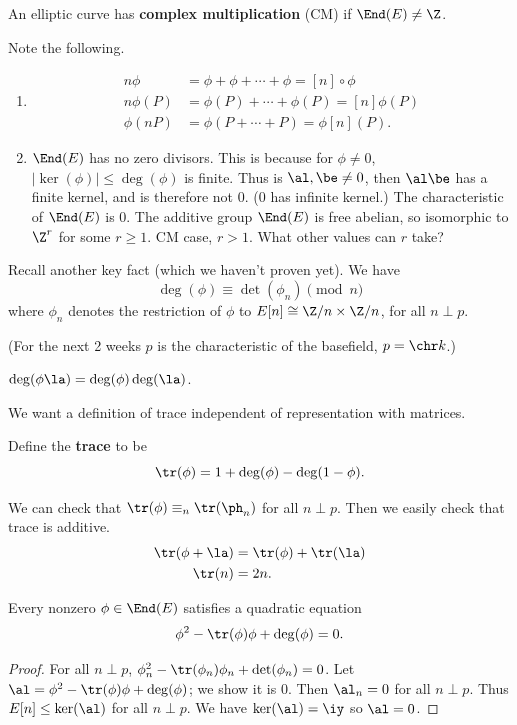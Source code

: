\begin{df}
An elliptic curve has \textbf{complex multiplication} (CM) if $\End(E)\ne \Z$. 
\end{df}
Note the following.
\begin{enumerate}
\item
\begin{align*}
n\phi&=\phi+\phi+\cdots +\phi = [n]\circ \phi\\
n\phi(P)&=\phi(P)+\cdots +\phi(P) = [n]\phi(P)\\
\phi(nP)&=\phi(P+\cdots +P)=\phi[n](P).
\end{align*}
\item
$\End(E)$ has no zero divisors. This is because for $\phi\ne 0$, $|\ker(\phi)|\le \deg(\phi)$ is finite. Thus is $\al,\be\ne 0$, then $\al\be$ has a finite kernel, and is therefore not 0. (0 has infinite kernel.) The characteristic of $\End(E)$ is 0. The additive group $\End(E)$ is free abelian, so isomorphic to $\Z^r$ for some $r\ge 1$. CM case, $r>1$. What other values can $r$ take?
\end{enumerate}
Recall another key fact (which we haven't proven yet). We have
\[
\deg(\phi)\equiv\det(\phi_n)\pmod{n}
\]
where $\phi_n$ denotes the restriction of $\phi$ to $E[n]\cong \Z/n\times \Z/n$, for all $n\perp p$.

(For the next 2 weeks $p$ is the characteristic of the basefield, $p=\chr k$.)

\begin{lem}
$\deg(\phi\la)=\deg(\phi)\deg(\la)$. 
\end{lem}
We want a definition of trace independent of representation with matrices.
\begin{df}
Define the \textbf{trace} to be
\[
\tr(\phi)=1+\deg(\phi)-\deg(1-\phi).
\]
\end{df}
We can check that $\tr(\phi)\equiv_n\tr(\ph_n)$ for all $n\perp p$.
Then we easily check that trace is additive. 
\begin{align*}
\tr(\phi+\la)&=\tr(\phi)+\tr(\la)\\
\tr(n)&=2n.
\end{align*}
\begin{thm}
Every nonzero $\phi\in \End(E)$ satisfies a quadratic equation
\[
\phi^2-\tr(\phi)\phi+\deg(\phi)=0.
\]
\end{thm}
\begin{proof}
For all $n\perp p$, $\phi_n^2-\tr(\phi_n)\phi_n+\det(\phi_n)=0$. Let $\al=\phi^2-\tr(\phi)\phi+\deg(\phi)$; we show it is 0.
Then $\al_n=0$ for all $n\perp p$. Thus $E[n]\le \ker(\al)$ for all $n\perp p$. We have $\ker(\al)=\iy$ so $\al=0$.
\end{proof}

